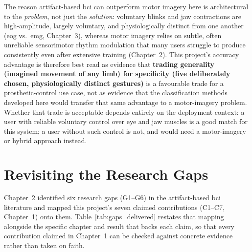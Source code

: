 The reason artifact-based \acrshort{bci} can outperform motor
imagery here is architectural to the \emph{problem}, not just the
\emph{solution}: voluntary blinks and jaw contractions are
high-amplitude, largely voluntary, and physiologically distinct
from one another (\acrshort{eog} vs.\ \acrshort{emg}, Chapter~3),
whereas motor imagery relies on subtle, often unreliable
sensorimotor rhythm modulation that many users struggle to produce
consistently even after extensive training (Chapter~2). This
project's accuracy advantage is therefore best read as evidence
that \textbf{trading generality (imagined movement of any limb) for
specificity (five deliberately chosen, physiologically distinct
gestures)} is a favourable trade for a prosthetic-control use case,
not as evidence that the classification methods developed here
would transfer that same advantage to a motor-imagery problem.
Whether that trade is acceptable depends entirely on the deployment
context: a user with reliable voluntary control over eye and jaw
muscles is a good match for this system; a user without such
control is not, and would need a motor-imagery or hybrid approach
instead.

\section{Revisiting the Research Gaps}
\label{sec:disc_gaps}

Chapter~2 identified six research gaps (G1--G6) in the
artifact-based \acrshort{bci} literature and mapped this project's
seven claimed contributions (C1--C7, Chapter~1) onto them.
Table~\ref{tab:gaps_delivered} restates that mapping alongside the
specific chapter and result that backs each claim, so that every
contribution claimed in Chapter~1 can be checked against concrete
evidence rather than taken on faith.

